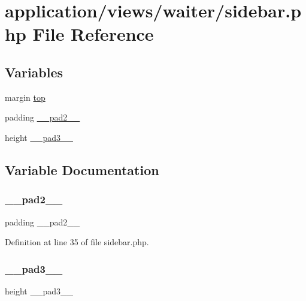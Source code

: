 \hypertarget{waiter_2sidebar_8php}{}\section{application/views/waiter/sidebar.php File Reference}
\label{waiter_2sidebar_8php}
\subsection*{Variables}
\begin{DoxyCompactItemize}
\item 
margin \mbox{\hyperlink{waiter_2sidebar_8php_a92a4f9c60f5fc724a2e9a4fdb35e9777}{top}}
\item 
padding \mbox{\hyperlink{waiter_2sidebar_8php_a0f9e8e71614b10009e0c99359fe08301}{\+\_\+\+\_\+pad2\+\_\+\+\_\+}}
\item 
height \mbox{\hyperlink{waiter_2sidebar_8php_a2ea3cef4643b89d8260257f4d17eede9}{\+\_\+\+\_\+pad3\+\_\+\+\_\+}}
\end{DoxyCompactItemize}


\subsection{Variable Documentation}
\mbox{\label{waiter_2sidebar_8php_a0f9e8e71614b10009e0c99359fe08301}} 
\subsubsection{\texorpdfstring{\_\_pad2\_\_}{\_\_pad2\_\_}}
{\footnotesize\ttfamily padding \+\_\+\+\_\+pad2\+\_\+\+\_\+}



Definition at line 35 of file sidebar.\+php.

\mbox{\label{waiter_2sidebar_8php_a2ea3cef4643b89d8260257f4d17eede9}} 
\subsubsection{\texorpdfstring{\_\_pad3\_\_}{\_\_pad3\_\_}}
{\footnotesize\ttfamily height \+\_\+\+\_\+pad3\+\_\+\+\_\+}



